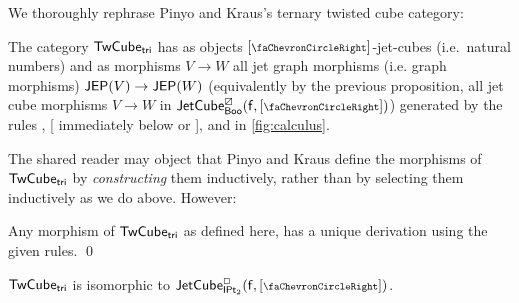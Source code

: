 \documentclass[a4paper]{memoir}
\begin{document}
We thoroughly rephrase Pinyo and Kraus's ternary twisted cube category:
\begin{definition} \cite[def.\ 34]{pinyo-twisted} \label{def:twisted-tri}
	The category ${\mathsf{TwCube}}_{\mathsf{tri}}$ has as objects $[\ypolar]$-jet-cubes (i.e.\ natural numbers) and as morphisms $V \to W$ all jet graph morphisms (i.e. graph morphisms) $\mathsf{JEP}(V) \to \mathsf{JEP}(W)$ (equivalently by the previous proposition, all jet cube morphisms $V \to W$ in $\jetcubefwd \cartes \booleanalg {[\ypolar]}$)	
	 generated by the rules , [ immediately below  or ],  and  in \cref{fig:calculus}.
\end{definition}
The shared reader may object that Pinyo and Kraus define the morphisms of ${\mathsf{TwCube}}_{\mathsf{tri}}$ by \emph{constructing} them inductively, rather than by selecting them inductively as we do above. However:
\begin{corollary} \label{thm:twisted-tri-inductive}
	Any morphism of ${\mathsf{TwCube}}_{\mathsf{tri}}$ as defined here, has a unique derivation using the given rules. \qed
\end{corollary}
\begin{proposition}
	${\mathsf{TwCube}}_{\mathsf{tri}}$ is isomorphic to $\jetcubefwd \affine \bipointedsym {[\ypolar]}$.
\end{proposition}
\end{document}
